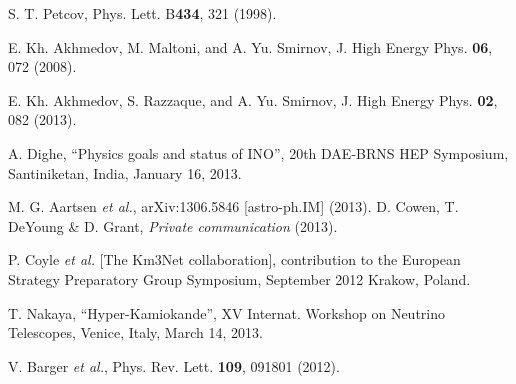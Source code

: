 S. T. Petcov, Phys. Lett. B{\bf 434}, 321 (1998).


E. Kh. Akhmedov, M. Maltoni, and A. Yu. Smirnov, J. High Energy Phys. {\bf 06}, 072 (2008).

E. Kh. Akhmedov, S. Razzaque, and A. Yu. Smirnov, J. High Energy Phys. {\bf 02}, 082 (2013).




A. Dighe, ``Physics goals and status of INO'', 20th DAE-BRNS HEP Symposium, Santiniketan, India, January 16, 2013.




 M. G. Aartsen {\it et al.}, 
arXiv:1306.5846 [astro-ph.IM] (2013).
 D. Cowen, T. DeYoung \& D. Grant,  {\it Private communication} (2013).


 P. Coyle {\it et al.} [The Km3Net collaboration], contribution to the European Strategy Preparatory Group Symposium, September 2012 Krakow, Poland.

 T. Nakaya, ``Hyper-Kamiokande'', XV Internat. Workshop on Neutrino Telescopes, Venice, Italy, March 14, 2013.

 V. Barger {\it et al.}, Phys. Rev. Lett. {\bf 109}, 091801 (2012).

